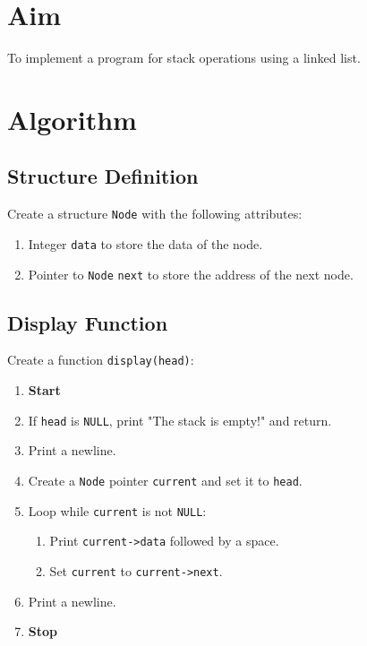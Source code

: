 
\section{Aim}
To implement a program for stack operations using a linked list.

\section{Algorithm}
 {\selectfont

  \subsection{Structure Definition}
  Create a structure \texttt{Node} with the following attributes:
  \begin{enumerate}[label=\arabic*:,left=0pt]
    \item Integer \texttt{data} to store the data of the node.
    \item Pointer to \texttt{Node} \texttt{next} to store the address of the next node.
  \end{enumerate}

  \subsection{Display Function}
  Create a function \texttt{display(head)}:
  \begin{enumerate}[label=\arabic*:,left=0pt]
    \item \textbf{Start}
    \item If \texttt{head} is \texttt{NULL}, print "The stack is empty!" and return.
    \item Print a newline.
    \item Create a \texttt{Node} pointer \texttt{current} and set it to \texttt{head}.
    \item Loop while \texttt{current} is not \texttt{NULL}:
          \begin{enumerate}[label=2.\arabic*:, start=1]
            \item Print \texttt{current->data} followed by a space.
            \item Set \texttt{current} to \texttt{current->next}.
          \end{enumerate}
    \item Print a newline.
    \item \textbf{Stop}
  \end{enumerate}

}
